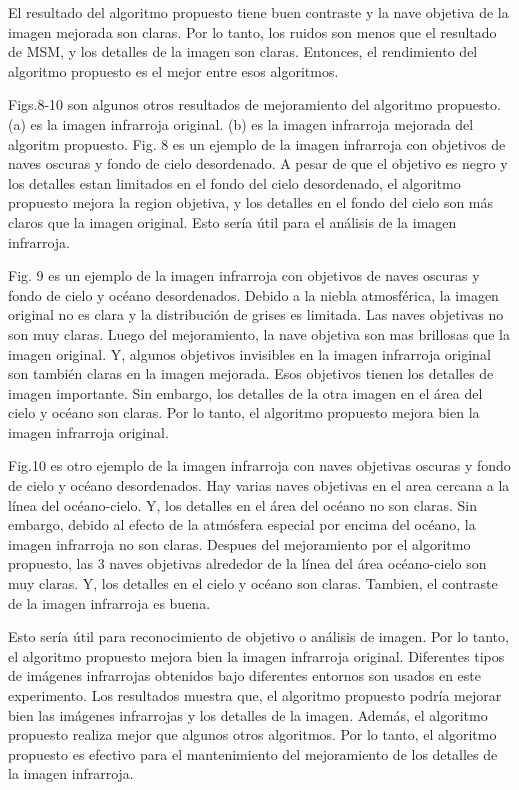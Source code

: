 \documentclass[a4paper, 11 pt, conference]{ieeeconf}      %
\begin{document}
El resultado del algoritmo propuesto tiene buen contraste y la nave objetiva de la imagen mejorada son claras. Por lo tanto, los ruidos son menos que el resultado de MSM, y los detalles de la imagen son claras. Entonces, el rendimiento del algoritmo propuesto es el mejor entre esos algoritmos.

Figs.8-10 son algunos otros resultados de mejoramiento del algoritmo propuesto. (a) es la imagen infrarroja original. (b) es la imagen infrarroja mejorada del algoritm propuesto. Fig. 8 es un ejemplo de la imagen infrarroja con objetivos de naves oscuras y fondo de cielo desordenado. A pesar de que el objetivo es negro y los detalles estan limitados en el fondo del cielo desordenado, el algoritmo propuesto mejora la region objetiva, y los detalles en el fondo del cielo son m\'as claros que la imagen original. Esto ser\'ia \'util para el an\'alisis de la imagen infrarroja.

Fig. 9 es un ejemplo de la imagen infrarroja con objetivos de naves oscuras y fondo de cielo y oc\'eano desordenados. Debido   a la niebla atmosf\'erica, la imagen original no es clara y la distribuci\'on de grises es limitada. Las naves objetivas no son muy claras. Luego del mejoramiento, la nave objetiva son mas brillosas que la imagen original. Y, algunos objetivos invisibles en la imagen infrarroja original son tambi\'en claras en la imagen mejorada. Esos objetivos tienen los detalles de imagen importante. Sin embargo, los detalles de la otra imagen en el \'area del cielo y oc\'eano son claras. Por lo tanto, el algoritmo propuesto mejora bien la imagen infrarroja original.

Fig.10 es otro ejemplo de la imagen infrarroja con naves objetivas oscuras y fondo de cielo y oc\'eano desordenados. Hay varias naves objetivas en el area cercana a la l\'inea del oc\'eano-cielo. Y, los detalles en el \'area del oc\'eano no son claras. Sin embargo, debido al efecto de la atm\'osfera especial por encima del oc\'eano, la imagen infrarroja no son claras. Despues del mejoramiento por el algoritmo propuesto, las 3 naves objetivas alrededor de la l\'inea del \'area oc\'eano-cielo son muy claras. Y, los detalles en el cielo y oc\'eano son claras. Tambien, el contraste de la imagen infrarroja es buena.

Esto ser\'ia \'util para reconocimiento de objetivo o an\'alisis de imagen. Por lo tanto, el algoritmo propuesto mejora bien la imagen infrarroja original.
Diferentes tipos de im\'agenes infrarrojas obtenidos bajo diferentes entornos son usados en este experimento. Los resultados muestra que, el algoritmo propuesto podr\'ia mejorar bien las im\'agenes infrarrojas y los detalles de la imagen. Adem\'as, el algoritmo propuesto realiza mejor que algunos otros algoritmos. Por lo tanto, el algoritmo propuesto es efectivo para el mantenimiento del mejoramiento de los detalles de la imagen infrarroja.
\end{document}

